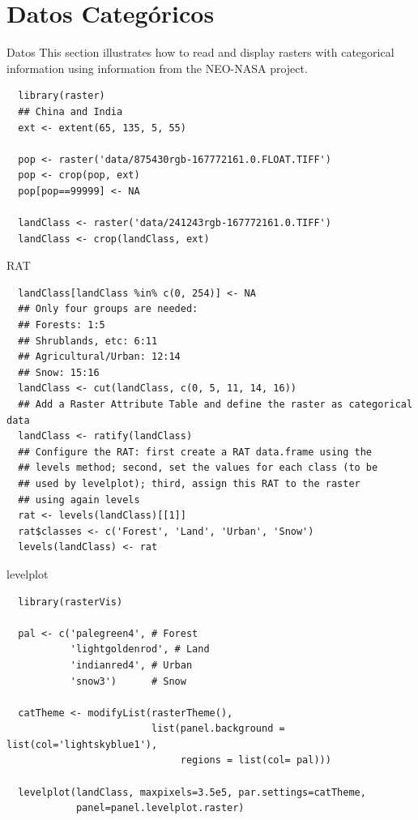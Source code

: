 \documentclass[xcolor={usenames,svgnames,dvipsnames}]{beamer}
\begin{document}
\section{Datos Categóricos}
\label{sec-3}
\begin{frame}[fragile,label=sec-3-1]{Datos}
 This section illustrates how to read and display rasters with
categorical information using information from the NEO-NASA
project. 
\lstset{language=R,label= ,caption= ,numbers=none}
\begin{lstlisting}
  library(raster)
  ## China and India  
  ext <- extent(65, 135, 5, 55)
  
  pop <- raster('data/875430rgb-167772161.0.FLOAT.TIFF')
  pop <- crop(pop, ext)
  pop[pop==99999] <- NA
  
  landClass <- raster('data/241243rgb-167772161.0.TIFF')
  landClass <- crop(landClass, ext)
\end{lstlisting}
\end{frame}

\begin{frame}[fragile,label=sec-3-2]{RAT}
 \lstset{language=R,label= ,caption= ,numbers=none}
\begin{lstlisting}
  landClass[landClass %in% c(0, 254)] <- NA
  ## Only four groups are needed:
  ## Forests: 1:5
  ## Shrublands, etc: 6:11
  ## Agricultural/Urban: 12:14
  ## Snow: 15:16
  landClass <- cut(landClass, c(0, 5, 11, 14, 16))
  ## Add a Raster Attribute Table and define the raster as categorical data
  landClass <- ratify(landClass)
  ## Configure the RAT: first create a RAT data.frame using the
  ## levels method; second, set the values for each class (to be
  ## used by levelplot); third, assign this RAT to the raster
  ## using again levels
  rat <- levels(landClass)[[1]]
  rat$classes <- c('Forest', 'Land', 'Urban', 'Snow')
  levels(landClass) <- rat
\end{lstlisting}
\end{frame}

\begin{frame}[fragile,label=sec-3-3]{levelplot}
 \lstset{language=R,label= ,caption= ,numbers=none}
\begin{lstlisting}
  library(rasterVis)
  
  pal <- c('palegreen4', # Forest
           'lightgoldenrod', # Land
           'indianred4', # Urban
           'snow3')      # Snow
  
  catTheme <- modifyList(rasterTheme(),
                         list(panel.background = list(col='lightskyblue1'),
                              regions = list(col= pal)))
  
  levelplot(landClass, maxpixels=3.5e5, par.settings=catTheme,
            panel=panel.levelplot.raster)
\end{lstlisting}
\end{frame}
\end{document}
